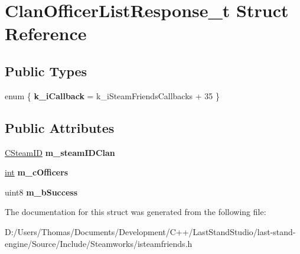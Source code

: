 \hypertarget{structClanOfficerListResponse__t}{}\section{Clan\+Officer\+List\+Response\+\_\+t Struct Reference}
\label{structClanOfficerListResponse__t}
\subsection*{Public Types}
\begin{DoxyCompactItemize}
\item 
\hypertarget{structClanOfficerListResponse__t_a702a7811b8f3b6a4fe5b08275ebe9276}{}enum \{ {\bfseries k\+\_\+i\+Callback} = k\+\_\+i\+Steam\+Friends\+Callbacks + 35
 \}\label{structClanOfficerListResponse__t_a702a7811b8f3b6a4fe5b08275ebe9276}

\end{DoxyCompactItemize}
\subsection*{Public Attributes}
\begin{DoxyCompactItemize}
\item 
\hypertarget{structClanOfficerListResponse__t_a20db8f1d370f8e8a6dea6f19c2d4b209}{}\hyperlink{classCSteamID}{C\+Steam\+I\+D} {\bfseries m\+\_\+steam\+I\+D\+Clan}\label{structClanOfficerListResponse__t_a20db8f1d370f8e8a6dea6f19c2d4b209}

\item 
\hypertarget{structClanOfficerListResponse__t_a6fc80fb07a22f732d96a936413cf721c}{}\hyperlink{SDL__thread_8h_a6a64f9be4433e4de6e2f2f548cf3c08e}{int} {\bfseries m\+\_\+c\+Officers}\label{structClanOfficerListResponse__t_a6fc80fb07a22f732d96a936413cf721c}

\item 
\hypertarget{structClanOfficerListResponse__t_a8aae147142a62f19731d46cd944bf2e9}{}uint8 {\bfseries m\+\_\+b\+Success}\label{structClanOfficerListResponse__t_a8aae147142a62f19731d46cd944bf2e9}

\end{DoxyCompactItemize}


The documentation for this struct was generated from the following file\+:\begin{DoxyCompactItemize}
\item 
D\+:/\+Users/\+Thomas/\+Documents/\+Development/\+C++/\+Last\+Stand\+Studio/last-\/stand-\/engine/\+Source/\+Include/\+Steamworks/isteamfriends.\+h\end{DoxyCompactItemize}
